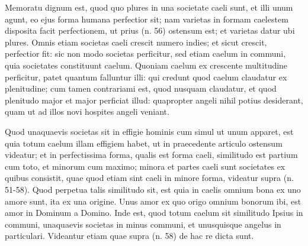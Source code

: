 \begin{topic}{71}
    Memoratu dignum est, quod quo plures in una societate caeli sunt, et illi unum agunt, eo ejus forma humana
    perfectior sit; nam varietas in formam caelestem disposita facit perfectionem, ut prius (n. 56) ostensum est; et
    varietas datur ubi plures.
    Omnis etiam societas caeli crescit numero indies; et sicut crescit, perfectior fit: sic non modo societas
    perficitur, sed etiam caelum in communi, quia societates constituunt caelum.
    Quoniam caelum ex crescente multitudine perficitur, patet quantum falluntur illi: qui credunt quod caelum claudatur
    ex plenitudine; cum tamen contrariami est, quod nusquam claudatur, et quod plenitudo major et major perficiat illud:
    quapropter angeli nihil potius desiderant, quam ut ad illos novi hospites angeli veniant.
\end{topic}

\begin{topic}{72}
    Quod unaquaevis societas sit in effigie hominis cum simul ut unum apparet, est quia totum caelum illam effigiem
    habet, ut in praecedente articulo ostensum videatur; et in perfectissima forma, qualis est forma caeli, similitudo
    est partium cum toto, et minorum cum maximo; minora et partes caeli sunt societates ex quibus consistit, quae quod
    etiam sint caeli in minore forma, videatur supra (n. 51-58).
    Quod perpetua talis similitudo sit, est quia in caelis omnium bona ex uno amore sunt, ita ex una origine.
    Unus amor ex quo origo omnium bonorum ibi, est amor in Dominum a Domino.
    Inde est, quod totum caelum sit similitudo Ipsius in communi, unaquaevis societas in minus communi, et unusquisque
    angelus in particulari.
    Videantur etiam quae supra (n. 58) de hac re dicta sunt.
\end{topic}
